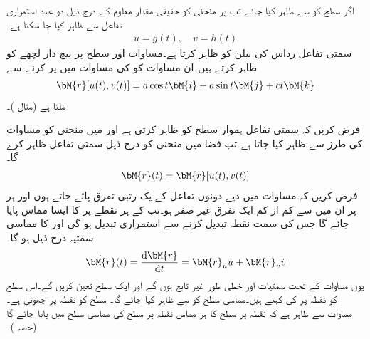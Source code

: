 اگر سطح  کو  سے ظاہر کیا جائے تب  پر منحنی کو حقیقی مقدار معلوم  کے درج ذیل دو عدد استمراری تفاعل سے ظاہر کیا جا سکتا ہے۔
\begin{align}\label{مساوات_خطی_تکمل_سطح_میں_منحنی_الف}
u=g(t),\quad v=h(t)
\end{align}
\quad سمتی تفاعل  رداس  کی بیلن  کو ظاہر کرتا ہے۔مساوات  اور  سطح  پر پیچ دار لچھے کو ظاہر کرتے ہیں۔ان مساوات کو  کی مساوات میں پر کرنے سے
\begin{align*}
\bM{r}[u(t),v(t)]=a\cos t\bM{i}+a\sin t\bM{j}+ct\bM{k}
\end{align*}
ملتا ہے (مثال )۔

فرض کریں کہ سمتی تفاعل  ہموار سطح  کو ظاہر کرتی ہے اور  میں منحنی  کو مساوات  کی طرز سے ظاہر کیا جاتا ہے۔تب فضا میں منحنی  کو درج ذیل سمتی تفاعل ظاہر کرے گا۔
\begin{align}\label{مساوات_خطی_تکمل_سطح_میں_منحنی_ب}
\bM{r}(t)=\bM{r}[u(t),v(t)]
\end{align}
فرض کریں کہ مساوات   میں دیے دونوں تفاعل کے یک رتبی تفرق پائے جاتے ہوں اور ہر  پر ان میں سے  کم از کم ایک تفرق غیر صفر ہو۔تب  کے ہر نقطے  پر  کا ایسا مماس پایا جائے گا جس کی سمت نقطہ تبدیل کرنے سے استمراری تبدیل ہو گی اور  کا مماسی سمتیہ درج ذیل ہو گا۔
\begin{align*}
\dot{\bM{r}}(t)=\frac{\dif \bM{r}}{\dif t}=\bM{r}_u\dot{u}+\bM{r}_v\dot{v}
\end{align*}
یوں مساوات  کے تحت سمتیات  اور
  خطی طور غیر تابع ہوں گے اور ایک سطح تعین کریں گے۔اس سطح کو  نقطہ  پر  کی  کہتے ہیں۔مماسی سطح کو  سے ظاہر کیا جائے گا۔ سطح  کو نقطہ  پر چھوتی ہے۔ مساوات  سے ظاہر ہے کہ  نقطہ  پر سطح  کا ہر مماس نقطہ  پر سطح کی مماسی سطح  میں پایا جائے گا (حصہ )۔


